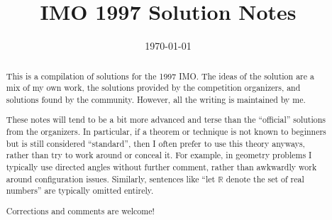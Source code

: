 \documentclass[11pt]{scrartcl}
\title{IMO 1997 Solution Notes}
\date{\today}
\begin{document}
\maketitle

\begin{abstract}
This is a compilation of solutions
for the 1997 IMO.
The ideas of the solution are a mix of my own work,
the solutions provided by the competition organizers,
and solutions found by the community.
However, all the writing is maintained by me.

These notes will tend to be a bit more advanced and terse than the ``official''
solutions from the organizers.
In particular, if a theorem or technique is not known to beginners
but is still considered ``standard'', then I often prefer to
use this theory anyways, rather than try to work around or conceal it.
For example, in geometry problems I typically use directed angles
without further comment, rather than awkwardly work around configuration issues.
Similarly, sentences like ``let $\mathbb{R}$ denote the set of real numbers''
are typically omitted entirely.

Corrections and comments are welcome!
\end{abstract}

\tableofcontents
\newpage

\addtocounter{section}{-1}
\end{document}
